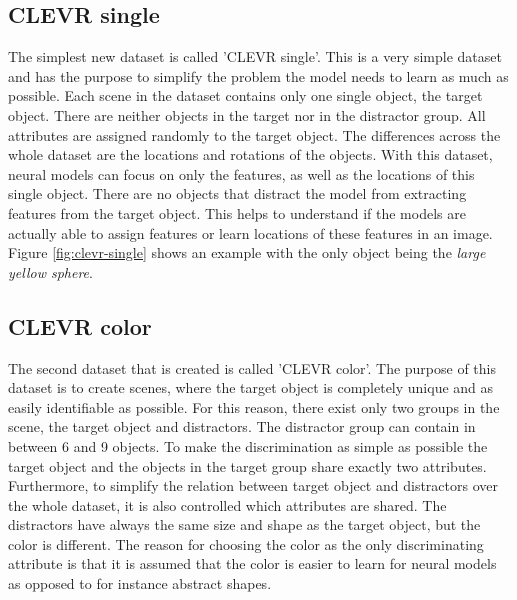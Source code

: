 \subsection{CLEVR single}
The simplest new dataset is called 'CLEVR single'.
This is a very simple dataset and has the purpose to simplify the problem the model needs to learn as much as possible.
Each scene in the dataset contains only one single object, the target object.
There are neither objects in the target nor in the distractor group.
All attributes are assigned randomly to the target object.
The differences across the whole dataset are the locations and rotations of the objects.
With this dataset, neural models can focus on only the features, as well as the locations of this single object.
There are no objects that distract the model from extracting features from the target object.
This helps to understand if the models are actually able to assign features or learn locations of these features in an image.
Figure \ref{fig:clevr-single} shows an example with the only object being the \emph{large yellow sphere}.

\subsection{CLEVR color}
The second dataset that is created is called 'CLEVR color'.
The purpose of this dataset is to create scenes, where the target object is completely unique and as easily identifiable as possible.
For this reason, there exist only two groups in the scene, the target object and distractors.
The distractor group can contain in between 6 and 9 objects.
To make the discrimination as simple as possible the target object and the objects in the target group share exactly two attributes.
Furthermore, to simplify the relation between target object and distractors over the whole dataset, it is also controlled which attributes are shared.
The distractors have always the same size and shape as the target object, but the color is different.
The reason for choosing the color as the only discriminating attribute is that it is assumed that the color is easier to learn for neural models as opposed to for instance abstract shapes.


